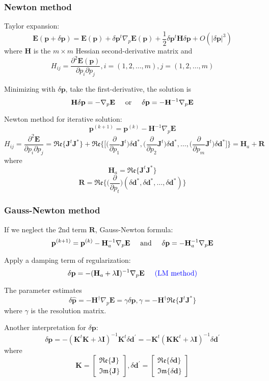 \documentclass{article}
\newcommand{\mbf}[1]{\mathbf{#1}}
\newcommand{\myno}[1]{{\color{blue}#1}}
\newcommand{\myRe}{\mathfrak{Re}}
\newcommand{\myIm}{\mathfrak{Im}}
\begin{document}
\subsubsection{Newton method}
Taylor expansion:
\[ \mbf E(\mbf p+\delta\mbf p)=\mbf E(\mbf p)+\delta\mbf p^t\nabla_p\mbf E(\mbf p)+\frac{1}{2}\delta\mbf p^t\mbf H\delta\mbf p+O(|\delta\mbf p|^3)  \]
where $\mbf H$ is the $m\times m$ Hessian second-derivative matrix and
\[ H_{ij}=\frac{\partial^2\mbf E(\mbf p)}{\partial p_i\partial p_j},i=(1,2,\ldots,m),j=(1,2,\ldots,m) \]\par
Minimizing with $\delta\mbf p$, take the first-derivative, the solution is
\[ \mbf H\delta\mbf p=-\nabla_p\mbf E \text{\hspace{5mm}or\hspace{5mm}} \delta\mbf p=-\mbf H^{-1}\nabla_p\mbf E \]\par
Newton method for iterative solution:
\[ \mbf p^{(k+1)}=\mbf p^{(k)}-\mbf H^{-1}\nabla_p\mbf E \]
\[ H_{ij}=\frac{\partial^2\mbf E}{\partial p_i\partial p_j}=\myRe\{\mbf J^t\mbf J^*\}+\myRe\Big\{\Big[\Big(\frac{\partial}{\partial p_1}\mbf J^t\Big)\delta\mbf d^*,\Big(\frac{\partial}{\partial p_2}\mbf J^t\Big)\delta\mbf d^*,\ldots,\Big(\frac{\partial}{\partial p_m}\mbf J^t\Big)\delta\mbf d^*\Big]\Big\}=\mbf H_a+\mbf R \]
where
\[ \mbf H_a=\myRe\{\mbf J^t\mbf J^*\} \]
\[ \mbf R=\myRe\Big\{\Big(\frac{\partial}{\partial p_t}\Big)(\delta\mbf d^*,\delta\mbf d^*,\ldots,\delta\mbf d^*)\Big\} \]\par
\subsubsection{Gauss-Newton method}
If we neglect the 2nd term $\mbf R$, Gauss-Newton formula:
\[ \mbf p^{(k+1)}=\mbf p^{(k)}-\mbf H_a^{-1}\nabla_p\mbf E \text{\hspace{5mm}and\hspace{5mm}} \delta\mbf p=-\mbf H_a^{-1}\nabla_p\mbf E \]\par
Apply a damping term of regularization:
\[ \delta\mbf p=-(\mbf H_a+\lambda\mbf I)^{-1}\nabla_p\mbf E \text{\hspace{5mm}\myno{(LM method)}}\]\par
The parameter estimates
\[ \delta\hat{\mbf p}=-\mbf H^\dagger\nabla_p\mbf E=\gamma\delta\mbf p,\gamma=-\mbf H^\dagger\myRe\{\mbf J^t\mbf J^*\} \]
where $\gamma$ is the resolution matrix.\par
Another interpretation for $\delta\mbf p$:
\[ \delta\mbf p=-(\mbf K^t\mbf K+\lambda\mbf I)^{-1}\mbf K^t\delta\mbf d^\prime=-\mbf K^t(\mbf K\mbf K^t+\lambda\mbf I)^{-1}\delta\mbf d^\prime \]
where
\begin{equation*}
\mbf K=\left[ \begin{array}{c}
\myRe\{\mbf J\} \\
\myIm\{\mbf J\}
\end{array}\right],
\delta\mbf d^\prime=\left[ \begin{array}{c}
\myRe\{\delta\mbf d\} \\
\myIm\{\delta\mbf d\}
\end{array}\right]
\end{equation*}\par
\end{document}
